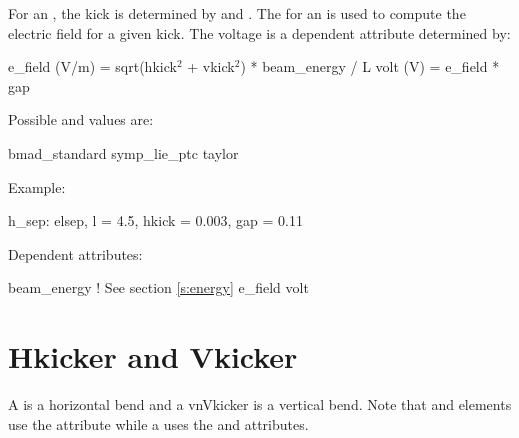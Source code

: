 For an , the kick is determined by  and
. The  for an  is used to compute
the electric field for a given kick. The voltage is a dependent
attribute determined by:
\begin{example}
  e\_field (V/m) = sqrt(hkick$^2$ + vkick$^2$) * beam\_energy / L
  volt (V) = e\_field * gap  
\end{example}


\vskip0.2in \noindent
Possible  and  values are:
\vskip 0.01in
\begin{example}
  bmad\_standard
  symp\_lie\_ptc
  taylor
\end{example}

\vskip0.2in \noindent
Example:
\begin{example}
  h_sep: elsep, l = 4.5, hkick = 0.003, gap = 0.11
\end{example}

\vskip0.2in \noindent
Dependent attributes:
\begin{example}
  beam\_energy  ! See section \ref{s:energy}
  e_field
  volt
\end{example}

\section{Hkicker and Vkicker}
\label{s:hvkicker}

A  is a horizontal bend and a vn{Vkicker} is a vertical
bend.  Note that  and  elements use the
 attribute while a  uses the  and  
attributes.

\begin{table}[h]
\end{table}


